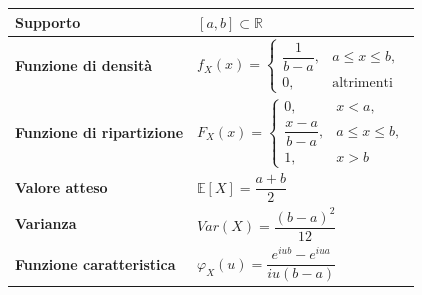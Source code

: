 \bigskip
\begin{table}[H]
\centering
\renewcommand{\arraystretch}{2}
\begin{tabular}{@{}ll@{}}
\toprule
\textbf{Supporto} 
& $[a,b]\subset\mathbb{R}$ \\

\midrule

\textbf{Funzione di densità} 
& $
f_X(x)=
\begin{cases}
\dfrac{1}{b-a}, & a \le x \le b,\\[6pt]
0, & \text{altrimenti}
\end{cases}
$ \\

\midrule

\textbf{Funzione di ripartizione}
& $
F_X(x)=
\begin{cases}
0, & x < a,\\[6pt]
\dfrac{x-a}{b-a}, & a \le x \le b,\\[6pt]
1, & x > b
\end{cases}
$ \\

\midrule

\textbf{Valore atteso} 
& $\mathbb{E}[X] = \dfrac{a+b}{2}$ \\

\midrule

\textbf{Varianza}
& $Var(X) = \dfrac{(b-a)^2}{12}$ \\

\midrule

\textbf{Funzione caratteristica}
& $
\varphi_X(u)
=
\dfrac{e^{iub}-e^{iua}}{iu(b-a)}
$ \\

\bottomrule
\end{tabular}
\end{table}
